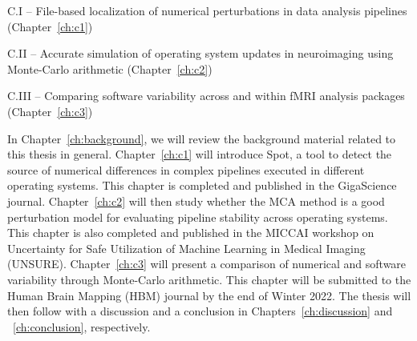 C.I – File-based localization of numerical perturbations in data analysis pipelines (Chapter~\ref{ch:c1})

C.II – Accurate simulation of operating system updates in neuroimaging using Monte-Carlo arithmetic (Chapter~\ref{ch:c2})

C.III – Comparing software variability across and within fMRI analysis packages (Chapter~\ref{ch:c3})


In Chapter~\ref{ch:background}, we will review the background material related to this thesis in general.
Chapter~\ref{ch:c1} will introduce Spot, a tool to detect the source of numerical differences in complex pipelines
executed in different operating systems. This chapter is completed and published in the
GigaScience journal. Chapter~\ref{ch:c2} will then study whether the MCA method is a good perturbation
model for evaluating pipeline stability across operating systems. This chapter is also completed and published
in the MICCAI workshop on Uncertainty for Safe Utilization of Machine Learning in Medical Imaging (UNSURE).
Chapter~\ref{ch:c3} will present a comparison of numerical and software variability through Monte-Carlo arithmetic.
This chapter will be submitted to the Human Brain Mapping (HBM) journal by the end of Winter 2022.
The thesis will then follow with a discussion and a conclusion in Chapters~\ref{ch:discussion} and ~\ref{ch:conclusion}, respectively.

